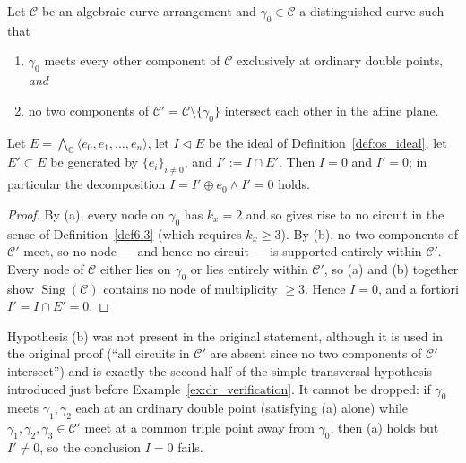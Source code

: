 \documentclass[article,11pt]{amsart} \numberwithin{equation}{section}
\numberwithin{equation}{section}
\begin{document}
{\begin{lm}
	\label{lem:ideal_decomp}
	Let $\mathcal C$ be an algebraic curve arrangement and $\gamma_0\in\mathcal C$
	a distinguished curve such that
	\begin{enumerate}
		\item $\gamma_0$ meets every other component of $\mathcal C$ exclusively at
		ordinary double points, \emph{and}
		\item no two components of $\mathcal C'=\mathcal C\setminus\{\gamma_0\}$
		intersect each other in the affine plane.
	\end{enumerate}
	Let $E=\bigwedge_\mathbb C\langle e_0,e_1,\dots,e_n\rangle$, let $I\vartriangleleft E$
	be the ideal of Definition~\ref{def:os_ideal}, let $E'\subset E$ be generated by
	$\{e_i\}_{i\neq0}$, and $I':=I\cap E'$. Then $I=0$ and $I'=0$; in particular
	the decomposition $I=I'\oplus e_0\wedge I'=0$ holds.
\end{lm}

\begin{proof}
	By (a), every node on $\gamma_0$ has $k_x=2$ and so gives rise to no circuit
	in the sense of Definition~\ref{def6.3} (which requires $k_x\ge3$). By (b), no two
	components of $\mathcal C'$ meet, so no node --- and hence no circuit --- is
	supported entirely within $\mathcal C'$. Every node of $\mathcal C$ either
	lies on $\gamma_0$ or lies entirely within $\mathcal C'$, so (a) and (b)
	together show $\operatorname{Sing}(\mathcal C)$ contains no node of multiplicity $\ge3$.
	Hence $I=0$, and a fortiori $I'=I\cap E'=0$.
\end{proof}

\begin{rk}
	Hypothesis (b) was not present in the original statement, although it is
	used in the original proof (``all circuits in $\mathcal C'$ are absent since
	no two components of $\mathcal C'$ intersect'') and is exactly the second
	half of the simple-transversal hypothesis introduced just before
	Example~\ref{ex:dr_verification}. It cannot be dropped: if $\gamma_0$ meets $\gamma_1,\gamma_2$
	each at an ordinary double point (satisfying (a) alone) while
	$\gamma_1,\gamma_2,\gamma_3\in\mathcal C'$ meet at a common triple point away
	from $\gamma_0$, then (a) holds but $I'\neq0$, so the conclusion $I=0$ fails.
\end{rk}

}
\end{document}
